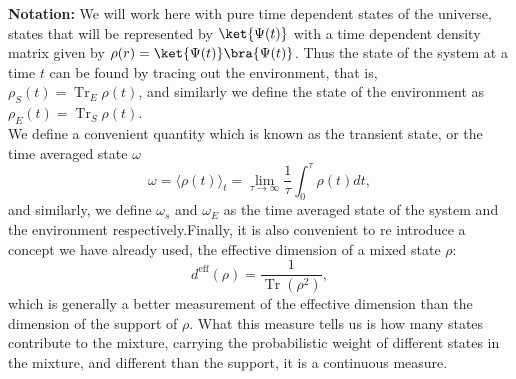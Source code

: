 \indent \textbf{Notation:} We will work here with pure time dependent states of the universe, states that will be represented by $\ket{\Psi(t)}$ with a time dependent density matrix given by $\rho(r) =\ket{\Psi(t)}\bra{\Psi(t)}$. Thus the state of the system at a time $t$ can be found by tracing out the environment, that is, $\rho_S(t)=\operatorname{Tr}_E \rho(t)$, and similarly we define the state of the environment as $\rho_E(t)=\operatorname{Tr}_S \rho(t)$.\\


\indent We define a convenient quantity which is known as the transient state, or the time averaged state $\omega$
\begin{equation}
\omega=\langle\rho(t)\rangle_{t}=\lim _{\tau \rightarrow \infty} \frac{1}{\tau} \int_{0}^{\tau} \rho(t) d t,
\label{CH1:average_time_state}
\end{equation}
and similarly, we define $\omega_s$ and $\omega_E$ as the time averaged state of the system and the environment respectively.Finally, it is also convenient to re introduce a concept we have already used, the effective dimension of a mixed state $\rho$:
\begin{equation}
d^{\mathrm{eff}}(\rho)=\frac{1}{\operatorname{Tr}\left(\rho^{2}\right)},
\label{CH1:Effective_dimension}
\end{equation}
which is generally a better measurement of the effective dimension than the dimension of the support of $\rho$. What this measure tells us is how many states contribute to the mixture, carrying the probabilistic weight of different states in the mixture, and different than the support, it is a continuous measure.\\

